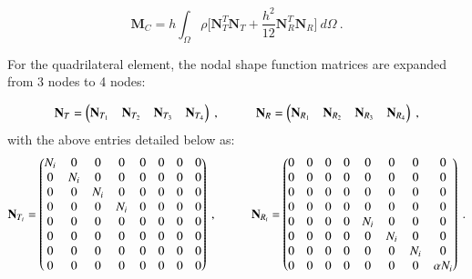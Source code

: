 \begin{equation} 
\mathbf{M}_C
=
h
\int_{\Omega} 
\rho 
\Big[
\mathbf{N}_T^T
\mathbf{N}_T
+
\frac{h^2}{12}
\mathbf{N}_R^T
\mathbf{N}_R
\Big]
\ d\Omega
\label{eqqmass4}\ .
\end{equation}

For the quadrilateral element, the nodal shape function matrices are expanded from 3 nodes to 4 nodes:

\begin{equation} 
\mathbf{N}_T = 
\begin{pmatrix}
\mathbf{N}_{T_1} & \mathbf{N}_{T_2} & \mathbf{N}_{T_3} & \mathbf{N}_{T_4}
\end{pmatrix}\ ,
\hspace{10mm}
\mathbf{N}_R = 
\begin{pmatrix}
\mathbf{N}_{R_1} & \mathbf{N}_{R_2} & \mathbf{N}_{R_3} & \mathbf{N}_{R_4}
\end{pmatrix}
\label{eqqmass5}\ ,
\end{equation}
with the above entries detailed below as:
\begin{equation} 
\mathbf{N}_{T_i} = 
\begin{pmatrix}
N_i & 0 & 0 & 0 & 0 & 0 & 0 & 0\\
0 & N_i & 0 & 0 & 0 & 0 & 0 & 0\\
0 & 0 & N_i & 0 & 0 & 0 & 0 & 0\\
0 & 0 & 0 & N_i & 0 & 0 & 0 & 0\\
0 & 0 & 0 & 0 & 0 & 0 & 0 & 0\\
0 & 0 & 0 & 0 & 0 & 0 & 0 & 0\\
0 & 0 & 0 & 0 & 0 & 0 & 0 & 0\\
0 & 0 & 0 & 0 & 0 & 0 & 0 & 0
\end{pmatrix}\ ,
\hspace{10mm}
\mathbf{N}_{R_i} = 
\begin{pmatrix}
0 & 0 & 0 & 0 & 0 & 0 & 0 & 0\\
0 & 0 & 0 & 0 & 0 & 0& 0 & 0\\
0 & 0 & 0 & 0 & 0 & 0 & 0 & 0\\
0 & 0 & 0 & 0 & 0 & 0 & 0 & 0\\
0 &0 & 0 & 0 & N_i & 0 & 0  & 0\\
0 &0 & 0 & 0 & 0 & N_i & 0  & 0\\
0 &0 & 0 & 0 & 0 & 0 & N_i  & 0\\
0 &0 & 0 & 0 & 0 & 0 & 0 & \alpha N_i
\end{pmatrix}
\label{eqqmass5_1}\ .
\end{equation}

